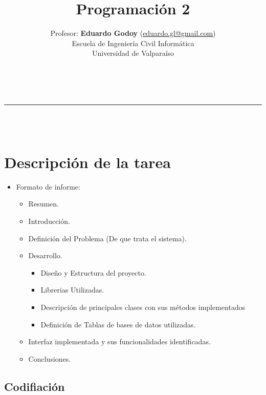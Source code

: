 \documentclass[a4paper,10pt]{article}
\makeatletter
\newcommand{\linia}{\rule{\linewidth}{0.5pt}}
\theoremstyle{mytheor}
\renewcommand{\maketitle}{
    \begin{center}
        \vspace{2ex}
        {\huge \textsc{\@title}}
        \vspace{1ex} \\
        \linia \\
        \hfill \@date  \\
        \@author
        \vspace{4ex}
    \end{center}
}
\makeatother
\begin{document}
\title{{\huge Programaci\'on 2}}

\date{ }

\author{Profesor: \textbf{Eduardo Godoy} (\href{mailto:eduardo.gl@gmail.com}{eduardo.gl@gmail.com}) \\ Escuela de Ingenier\'ia Civil  Inform\'atica \\ Universidad de Valpara\'iso \\}

\maketitle

\section{Descripci\'on de la tarea}

\begin{itemize}
    \item Formato de informe:
\begin{itemize}
  \item Resumen.
  \item Introducci\'on.
  \item Definici\'on del Problema (De que trata el sistema).
  \item Desarrollo.
    \begin{itemize}
      \item Diseño y Estructura del proyecto.
      \item Librerias Utilizadas.
      \item Descripción de principales clases con sus métodos implementados
      \item Definición de Tablas de bases de datos utilizadas.
    \end{itemize}
  \item Interfaz implementada y sus funcionalidades identificadas.
  \item Conclusiones.
\end{itemize}

\end{itemize}

\subsection{Codifiaci\'on}
\end{document}
